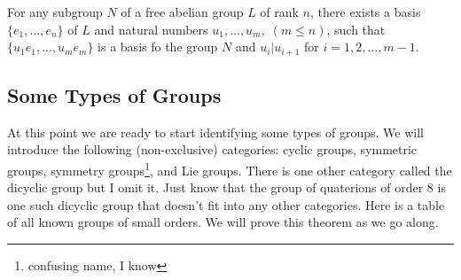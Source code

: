 \documentclass{article}
\begin{document}
  \begin{theorem}
    For any subgroup $N$ of a free abelian group $L$ of rank $n$, there exists a basis $\{e_1, ..., e_n\}$ of $L$ and natural numbers $u_1, ..., u_m, \; (m \leq n)$, such that $\{u_1 e_1, ..., u_m e_m\}$ is a basis fo the group $N$ and $u_i | u_{i+1}$ for $i = 1, 2, ..., m-1$. 
  \end{theorem}

\subsection{Some Types of Groups} 

  At this point we are ready to start identifying some types of groups. We will introduce the following (non-exclusive) categories: cyclic groups, symmetric groups, symmetry groups\footnote{confusing name, I know}, and Lie groups. There is one other category called the dicyclic group but I omit it. Just know that the group of quaterions of order $8$ is one such dicyclic group that doesn't fit into any other categories. Here is a table of all known groups of small orders. We will prove this theorem as we go along. 
\end{document}

